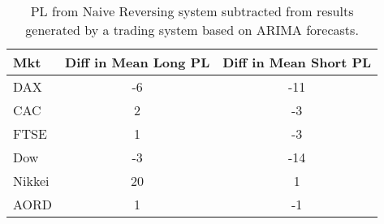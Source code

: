 \begin{table}[ht]
\centering
\caption[ARIMA system results minus Naive Reversing results]{PL from Naive Reversing system subtracted from results generated by a trading system based on ARIMA forecasts.} 
\label{tab:chp_ts:arima1_diff}
\begin{tabular}{lcc}
  \toprule Mkt & Diff in Mean Long PL & Diff in Mean Short PL \\ 
  \midrule DAX & -6 & -11 \\ 
  CAC & 2 & -3 \\ 
  FTSE & 1 & -3 \\ 
  Dow & -3 & -14 \\ 
  Nikkei & 20 & 1 \\ 
  AORD & 1 & -1 \\ 
   \bottomrule \end{tabular}
\end{table}

